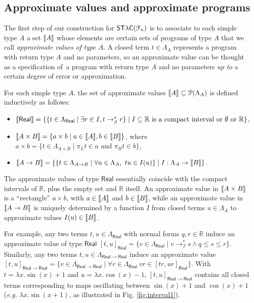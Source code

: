 \subsection{Approximate values and approximate programs}

The first step of our construction for $\mathsf{ST\lambda C}(\mathcal F_{n})$ is to associate to each simple type $A$ a set $\llbracket A \rrbracket$ whose elements are certain sets of programs of type $A$ that we call \emph{approximate values of type $A$}. 
A closed term $t\in \Lambda_{A}$ represents a program with return type $A$ and no parameters, so an approximate value can be thought as a specification of a program with return type $A$ and no parameters \emph{up to} a certain degree of error or approximation.

For each simple type $A$, the set of approximate values $\llbracket A \rrbracket\subseteq \mathcal P(\Lambda_A)$ is defined inductively as follows:
\begin{itemize}
\item $\llbracket \mathsf{Real} \rrbracket = \{ \{ t \in \Lambda_\mathsf{Real} \mid \exists r \in I, t \to_\beta^* r \} \mid I \subseteq \mathbb{R} \text{ is a compact interval or $\emptyset$ or } \mathbb{R} \}$,
\item $\llbracket A \times B \rrbracket = \{ a \times b \mid a  \in \llbracket A \rrbracket, b \in \llbracket B \rrbracket \}$, where $a \times b = \{ t \in \Lambda_{A \times B} \mid \pi_L t \in a \text{ and } \pi_R t \in b \}$,
\item $\llbracket A \to B \rrbracket = \{ \{ t \in \Lambda_{A \to B} \mid \forall u \in \Lambda_{A},~ tu \in I(u) \} \mid I : \Lambda_A \to \llbracket B \rrbracket \}$.
\end{itemize}

The approximate values of type $\mathsf{Real}$ essentially coincide with the compact intervals of $\mathbb R$, plus the empty set and $\mathbb{R}$ itself. An approximate value in $\llbracket A\times B \rrbracket$ is a ``rectangle'' $a \times b$, with $a\in \llbracket A \rrbracket$ and $b \in \llbracket B \rrbracket$, while an approximate value in $\llbracket A\to B \rrbracket$ is uniquely determined by a function 
$I$ from closed terms $u\in \Lambda_{ A}$ to approximate values $I(u)\in \llbracket B \rrbracket$.

For example, any two terms $t,u\in \Lambda_{\mathsf{Real}}$ with normal forms $q,r\in \mathbb{R}$ induce an approximate value of type $\mathsf{Real}$ $[t,u]_{\mathsf{Real}}= \{v\in \Lambda_{\mathsf{Real}}\mid  v\to_{\beta}^{*} s \land q\leq s\leq r\}$. Similarly, any two terms $t,u\in \Lambda_{\mathsf{Real}\to \mathsf{Real}}$ induce an approximate value
$[t,u]_{\mathsf{Real}\to \mathsf{Real}}= \{v\in \Lambda_{\mathsf{Real}\to\mathsf{Real}}\mid  
\forall r \in \Lambda_{\mathsf{Real}} \ vr\in [ tr, ur]_{\mathsf{Real}} 
\}$. With $t= \lambda x.\sin(x)+1$ and $u=\lambda x.\cos(x)-1$, 
$[t,u]_{\mathsf{Real}\to \mathsf{Real}}$ contains all closed terms corresponding to maps oscillating between $\sin (x)+1$ and $\cos(x)+1$ (\textit{e.g.} $\lambda x. \sin(x+1)$, as illustrated in Fig. \ref{fig:interval1}).

